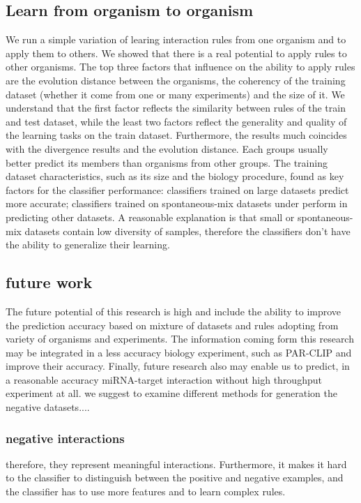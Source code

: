 \documentclass{bmcart}
\begin{document}
\subsection*{Learn from organism to organism}
We run a simple variation of learing interaction rules from one organism and to apply them to others. We showed that there is a real potential to apply rules to other organisms. The top three factors that influence on the ability to apply rules are the evolution distance between the organisms, the coherency of the training dataset (whether it come from one or many experiments) and the size of it. We understand that the first factor reflects the similarity between rules of the train and test dataset, while the least two factors reflect the generality and quality of the learning tasks on the train dataset.
Furthermore, the results much coincides with the divergence results and the evolution distance. Each groups usually better predict its members than organisms from other groups. The training dataset characteristics, such as its size and the biology procedure, found as key factors for the classifier performance: classifiers trained on large datasets predict more accurate;  classifiers trained on spontaneous-mix datasets under perform in predicting other datasets. A reasonable explanation is that small or spontaneous-mix datasets contain low diversity of samples, therefore the classifiers don't have the ability to generalize their learning.


\subsection*{future work}
The future potential of this research is high and include the ability to improve the prediction accuracy based on mixture of datasets and rules adopting from variety of organisms and experiments. The information coming form this research may be integrated in a less accuracy biology experiment, such as PAR-CLIP and improve their accuracy. Finally, future research also may enable us to predict, in a reasonable accuracy miRNA-target interaction without high throughput experiment at all.
we suggest to examine different methods for generation the negative datasets....




\subsubsection{negative interactions}
 therefore, they represent meaningful interactions. Furthermore, it makes it hard to the classifier to distinguish between the positive and negative examples, and the classifier has to use more features and to learn complex rules.
\end{document}

